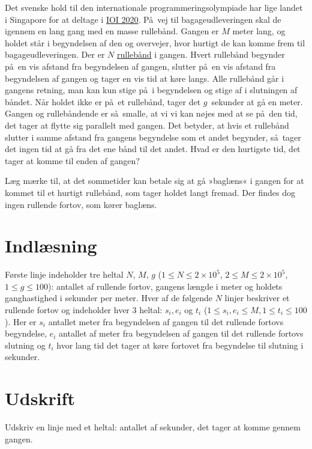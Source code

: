 
Det svenske hold til den internationale programmeringsolympiade har lige landet i Singapore for at deltage i
 \href{https://ioi2020.sg/}{IOI 2020}.
På vej til bagageudleveringen skal de igennem en lang gang med en masse rullebånd.
Gangen er $M$ meter lang, og holdet står i begyndelsen af den og overvejer, hvor hurtigt de kan komme frem til bagageudleveringen. 
Der er $N$ \href{https://sv.wikipedia.org/wiki/Rullande_trottoar}{rullebånd} i gangen.
Hvert rullebånd begynder på en vis afstand fra begyndelsen af gangen, slutter på en vis afstand fra begyndelsen af gangen og tager en vis tid at køre langs.
Alle rullebånd går i gangens retning, man kan kun stige på i begyndelsen og stige af i slutningen af båndet.
Når holdet ikke er på et rullebånd, tager det $g$~sekunder at gå en meter.
Gangen og rullebåndende er så smalle, at vi vi kan nøjes med at se på den tid, det tager at flytte sig parallelt med gangen.
Det betyder, at hvis et rullebånd slutter i samme afstand fra gangens begyndelse som et andet begynder, så tager det ingen tid at gå fra det ene bånd til det andet.
Hvad er den hurtigste tid, det tager at komme til enden af gangen?

Læg mærke til, at det sommetider kan betale sig at gå »baglæns« i gangen for at kommet til et hurtigt rullebånd, som tager holdet langt fremad.
Der findes dog ingen rullende fortov, som kører baglæns.

\section*{Indlæsning}
Første linje indeholder tre heltal $N$, $M$, $g$ ($1 \le N \le 2 \times 10^5$, $2 \le M \le 2 \times 10^5$, $1 \le g \le 100$):
antallet af rullende fortov, gangens længde i meter og holdets ganghastighed i sekunder per meter.
Hver af de følgende $N$ linjer beskriver et rullende fortov og indeholder hver 3 heltal: $s_i, e_i$ og $t_i$
($1\leq s_i,e_i\leq M,1\leq t_i\leq100$).
Her er $s_i$  antallet meter fra begyndelsen af gangen til det rullende fortovs begyndelse, $e_i$ antallet af meter fra begyndelsen af gangen til det rullende fortovs slutning og $t_i$ hvor lang tid det tager at køre fortovet fra begyndelse til slutning i sekunder.

\section*{Udskrift}
Udskriv en linje med et heltal: antallet af sekunder, det tager at komme gennem gangen.

